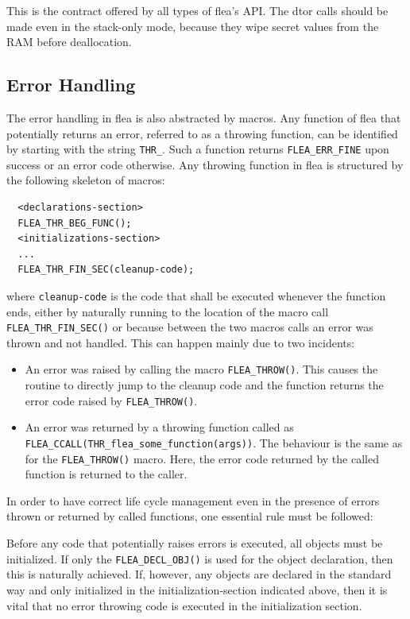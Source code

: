 \documentclass[a4paper,11pt]{scrartcl}
\begin{document}
This is the contract offered by all types of flea's API. The dtor calls should
be made even in the stack-only mode, because they wipe secret values from the
RAM before deallocation.

\subsection{Error Handling}
The error handling in flea is also abstracted by macros. Any function of flea
that potentially returns an error, referred to as a throwing function, can be identified by starting with the string
\verb#THR_#. Such a function returns \verb#FLEA_ERR_FINE# upon success or an
error code otherwise.
Any throwing function in flea is structured by the following skeleton of macros:
\begin{verbatim}
  <declarations-section>
  FLEA_THR_BEG_FUNC();
  <initializations-section>
  ...
  FLEA_THR_FIN_SEC(cleanup-code);
\end{verbatim}
where \verb#cleanup-code# is the code that shall be executed whenever the function ends,
either by naturally running to the location of the macro call
\verb#FLEA_THR_FIN_SEC()# or because between the two macros calls an error was
thrown and not handled. This can happen mainly due to two incidents:
\begin{itemize}
  \item An error was raised by calling the macro \verb#FLEA_THROW()#. This
    causes the routine to directly jump to the cleanup code and the function
    returns the error code raised by \verb#FLEA_THROW()#. 
  \item An error was returned by a throwing function called as
    \verb#FLEA_CCALL(THR_flea_some_function(args))#. The behaviour is the same
    as for the \verb#FLEA_THROW()# macro. Here, the error code returned by the
    called function is returned to the caller.
\end{itemize}

In order to have correct life cycle management even in the presence of errors
thrown or returned by called functions, one essential rule must be followed:

Before any code that potentially raises errors is executed, all objects
    must be initialized. If only the \verb#FLEA_DECL_OBJ()# is used for the
    object declaration, then this is naturally achieved. If, however, any
    objects are declared in the standard way and only initialized in the
    initialization-section indicated above, then it is vital that no error
    throwing code is executed in the initialization section.
\end{document}
